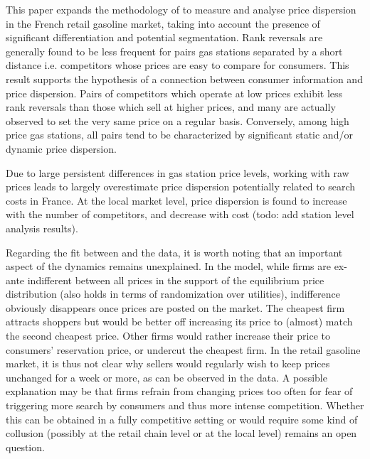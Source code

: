 \documentclass[english]{article}
\begin{document}
This paper expands the methodology of \cite{TAP11} to measure and analyse price dispersion in the French retail gasoline market, taking into account the presence of significant differentiation and potential segmentation. Rank reversals are generally found to be less frequent for pairs gas stations separated by a short distance i.e. competitors whose prices are easy to compare for consumers. This result supports the hypothesis of a connection between consumer information and price dispersion. Pairs of competitors which operate at low prices exhibit less rank reversals than those which sell at higher prices, and many are actually observed to set the very same price on a regular basis. Conversely, among high price gas stations, all pairs tend to be characterized by significant static and/or dynamic price dispersion.

Due to large persistent differences in gas station price levels, working with raw prices leads to largely overestimate price dispersion potentially related to search costs in France. At the local market level, price dispersion is found to increase with the number of competitors, and decrease with cost (todo: add station level analysis results).

Regarding the fit between \cite{VAR80} and the data, it is worth noting that an important aspect of the dynamics remains unexplained. In the model, while firms are ex-ante indifferent between all prices in the support of the equilibrium price distribution (also holds in terms of randomization over utilities), indifference obviously disappears once prices are posted on the market. The cheapest firm attracts shoppers but would be better off increasing its price to (almost) match the second cheapest price. Other firms would rather increase their price to consumers' reservation price, or undercut the cheapest firm. In the retail gasoline market, it is thus not clear why sellers would regularly wish to keep prices unchanged for a week or more, as can be observed in the data. A possible explanation may be that firms refrain from changing prices too often for fear of triggering more search by consumers and thus more intense competition. Whether this can be obtained in a fully competitive setting  or would require some kind of collusion (possibly at the retail chain level or at the local level) remains an open question.

\newpage



\newpage

\appendix
\end{document}
